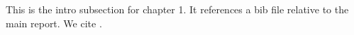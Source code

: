 This is the intro subsection for chapter 1.
It references a bib file relative to the main report.
We cite \cite{adv_ref}.